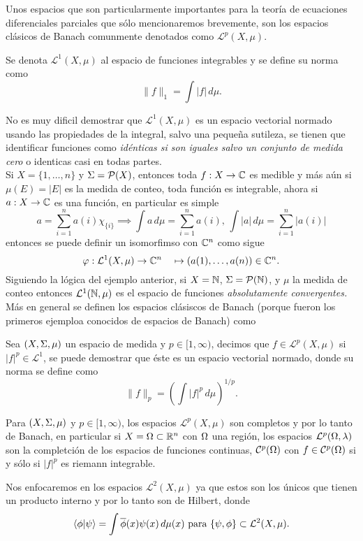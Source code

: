 \documentclass[main.tex]{subfiles}
\begin{document}
\noindent Unos espacios que son particularmente importantes para la teoría de ecuaciones diferenciales parciales que sólo mencionaremos brevemente, son los espacios clásicos de Banach comunmente denotados como $\mathcal{L}^p(X,\mu)$.
\begin{def.}
  Se denota $\mathcal{L}^1(X,\mu)$ al espacio de funciones integrables y se define su norma como
\[
  \|f\|_1=\int|f|\,d\mu.
\]
  \end{def.}
\obs No es muy dificil demostrar que $\mathcal{L}^1(X,\mu)$ es un espacio vectorial normado usando las propiedades de la integral, salvo una pequeña sutileza, se tienen que identificar funciones como \emph{idénticas si son iguales salvo un conjunto de medida cero} o identicas casi en todas partes.\\
\eje Si $X=\{1,\dots,n\}$ y $\Sigma=\mathcal{P}(X)$, entonces toda $f:X\to\mathbb C $ es medible y más aún si $\mu(E)=|E|$ es la medida de conteo, toda función es integrable, ahora si $a:X\to\mathbb C $ es una función, en particular es simple
\[
 a=\sum^n_{i=1}a(i)\chi_{\{i\}}\implies\int a\,d\mu=\sum^n_{i=1}a(i),\,\int |a|\,d\mu=\sum^n_{i=1}|a(i)|
 \]
entonces se puede definir un isomorfimso con $\mathbb{C}^n$ como sigue
\[
\varphi:\mathcal{L}^1(X,\mu)\to\mathbb{C}^n\quad\mapsto(a(1),\dots,a(n))\in\mathbb{C}^n.
\]
\eje Siguiendo la lógica del ejemplo anterior, si $X= \mathbb N $, $\Sigma=\mathcal{P}( \mathbb N )$, y $\mu$ la medida de conteo entonces $\mathcal{L}^1( \mathbb N ,\mu)$ es el espacio de funciones \emph{absolutamente convergentes.}\\
Más en general se definen los espacios clásiscos de Banach (porque fueron los primeros ejemploa conocidos de espacios de Banach) como
\begin{def.} Sea $(X,\Sigma,\mu)$ un espacio de medida y $p\in[1,\infty)$, decimos que $f\in\mathcal{L}^p(X,\mu)$ si $|f|^p\in\mathcal{L}^1$, se puede demostrar que éste es un espacio vectorial normado, donde su norma se define como
\[
\|f\|_p = \left(\int |f|^p \, d\mu\right)^{1/p}.
\]
\end{def.}
\begin{teorema}
  Para $(X,\Sigma,\mu)$ y $p\in[1,\infty)$, los espacios $\mathcal{L}^p(X,\mu)$ son completos y por lo tanto de Banach, en particular si $X=\Omega\subset\mathbb R ^n$ con $\Omega$ una región, los espacios $\mathcal{L}^p(\Omega,\lambda)$ son la completción de los espacios de funciones continuas, $\mathcal{C}^{p}(\Omega)$ con $f\in\mathcal{C}^{p}(\Omega)$ si y sólo si $|f|^p$ es riemann integrable.
  \end{teorema}
\obs Nos enfocaremos en los espacios $\mathcal{L}^2(X,\mu)$ ya que estos son los únicos que tienen un producto interno y por lo tanto son de Hilbert, donde
\[
\braket{\phi|\psi}=\int\overline{\phi}(x)\psi(x)\,d\mu(x)\text{ para }\{\psi,\phi\}\subset\mathcal{L}^2(X,\mu).
\]
\end{document}
